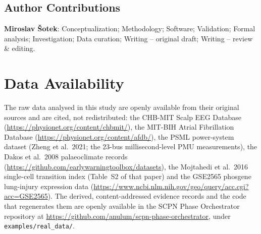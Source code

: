 \documentclass[aip,cha,preprint,amsmath,amssymb]{revtex4-2}
\newcommand{\code}[1]{\texttt{#1}}
\begin{document}
\subsection*{Author Contributions}

\textbf{Miroslav \v{S}otek}: Conceptualization; Methodology; Software;
Validation; Formal analysis; Investigation; Data curation;
Writing -- original draft; Writing -- review \& editing.

\section*{Data Availability}

The raw data analysed in this study are openly available from their
original sources and are cited, not redistributed: the CHB-MIT Scalp
EEG Database (\url{https://physionet.org/content/chbmit/}), the MIT-BIH
Atrial Fibrillation Database (\url{https://physionet.org/content/afdb/}),
the PSML power-system dataset (Zheng et al.\ 2021; the 23-bus
millisecond-level PMU measurements), the Dakos et al.\ 2008
palaeoclimate records (\url{https://github.com/earlywarningtoolbox/datasets}),
the Mojtahedi et al.\ 2016 single-cell transition index (Table~S2 of
that paper) and the GSE2565 phosgene lung-injury expression data
(\url{https://www.ncbi.nlm.nih.gov/geo/query/acc.cgi?acc=GSE2565}). The
derived, content-addressed evidence records and the code that
regenerates them are openly available in the SCPN Phase Orchestrator
repository at \url{https://github.com/anulum/scpn-phase-orchestrator},
under \code{examples/real\_data/}.
\end{document}
